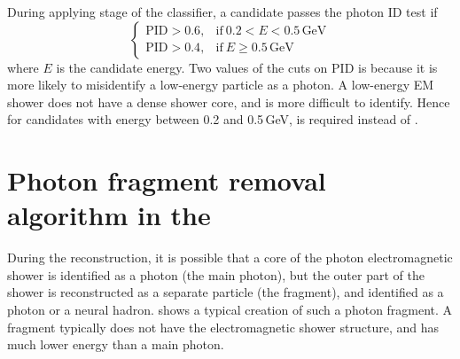 During applying stage of the classifier, a candidate passes the photon ID test if
\begin{equation}
\begin{cases}
  \text{PID} > 0.6, & \text{if}\ 0.2 < E < 0.5\,\text{GeV}\\
  \text{PID} > 0.4, & \text{if}\ E \geqslant 0.5\,\text{GeV}
\end{cases}
\end{equation}
where $E$ is the candidate energy. Two values of the cuts on $\text{PID}$ is because it is more likely to misidentify a low-energy particle as a photon. A low-energy EM shower does not have a dense shower core, and is more difficult to identify. Hence for candidates with energy between 0.2 and 0.5\,GeV,  is required instead of .





\section{Photon fragment removal algorithm in the \ECAL}
\label{sec:photonFragRemoval}
During the reconstruction, it is possible that a core of the photon electromagnetic shower is identified as a photon (the main photon), but the outer part of the shower is reconstructed as a separate particle (the fragment), and identified as a photon or a neural hadron.  shows a typical creation of such a photon fragment. A fragment typically does not have the electromagnetic shower structure, and has much lower energy than a main photon.


